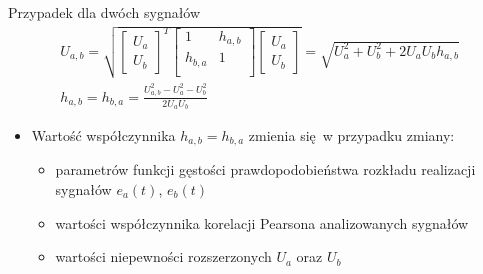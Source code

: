 \documentclass[12pt, polish, aspectratio = 169]{beamer}
\begin{document}
\begin{frame}{Przypadek dla dwóch sygnałów}
\begin{gather}
U_{a,b} = \sqrt{
\begin{bmatrix}
U_{a} \\ U_{b}
\end{bmatrix}^{T}
\begin{bmatrix}
1         & h_{a,b} \\
h_{b,a}   & 1       \\
\end{bmatrix}
\begin{bmatrix}
U_{a} \\ U_{b}
\end{bmatrix}} =
\sqrt{U_{a}^{2} + U_{b}^{2} + 2 U_{a} U_{b} h_{a,b}}
\label{eq:unc_mattwo} \\
h_{a,b} = h_{b,a} = \frac{U_{a,b}^{2} - U_{a}^{2} - U_{b}^{2}}{2 U_{a} U_{b}} \label{eq:unc_cohertwo}
\end{gather}
\begin{itemize}
\item Wartość współczynnika $h_{a,b} = h_{b,a}$ zmienia się w przypadku zmiany:
	\begin{itemize}
	\item parametrów funkcji gęstości prawdopodobieństwa rozkładu realizacji sygnałów $e_{a}(t)$, $e_{b}(t)$
	\item wartości współczynnika korelacji Pearsona analizowanych sygnałów
	\item wartości niepewności rozszerzonych $U_{a}$ oraz $U_{b}$
	\end{itemize}
\end{itemize}
\end{frame}
\end{document}
